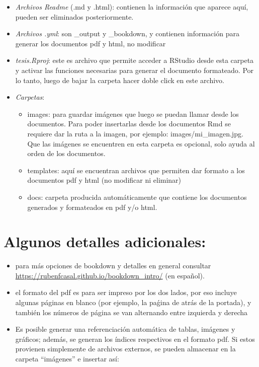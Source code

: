 \documentclass[12pt,twoside]{templates/facsothesis}
\providecommand{\tightlist}{%
  \setlength{\itemsep}{0pt}\setlength{\parskip}{0pt}}
\begin{document}
\begin{itemize}
\item
  \emph{Archivos Readme} (.md y .html): contienen la información que aparece aquí, pueden ser eliminados posteriormente.
\item
  \emph{Archivos .yml}: son \_output y \_bookdown, y contienen información para generar los documentos pdf y html, no modificar
\item
  \emph{tesis.Rproj}: este es archivo que permite acceder a RStudio desde esta carpeta y activar las funciones necesarias para generar el documento formateado. Por lo tanto, luego de bajar la carpeta hacer doble click en este archivo.
\item
  \emph{Carpetas}:

  \begin{itemize}
  \tightlist
  \item
    images: para guardar imágenes que luego se puedan llamar desde los documentos. Para poder insertarlas desde los documentos Rmd se requiere dar la ruta a la imagen, por ejemplo: images/mi\_imagen.jpg. Que las imágenes se encuentren en esta carpeta es opcional, solo ayuda al orden de los documentos.
  \item
    templates: aquí se encuentran archivos que permiten dar formato a los documentos pdf y html (no modificar ni eliminar)
  \item
    docs: carpeta producida automáticamente que contiene los documentos generados y formateados en pdf y/o html.
  \end{itemize}
\end{itemize}

\hypertarget{algunos-detalles-adicionales}{%
\section{Algunos detalles adicionales:}\label{algunos-detalles-adicionales}}

\begin{itemize}
\item
  para más opciones de bookdown y detalles en general consultar \url{https://rubenfcasal.github.io/bookdown_intro/} (en español).
\item
  el formato del pdf es para ser impreso por los dos lados, por eso incluye algunas páginas en blanco (por ejemplo, la paǵina de atrás de la portada), y también los números de página se van alternando entre izquierda y derecha
\item
  Es posible generar una referenciación automática de tablas, imágenes y gráficos; además, se generan los índices respectivos en el formato pdf. Si estos provienen simplemente de archivos externos, se pueden almacenar en la carpeta ``imágenes'' e insertar así:
\end{itemize}
\end{document}
